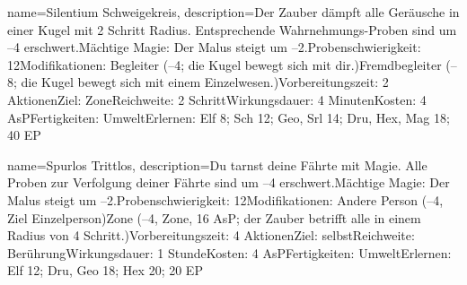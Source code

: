 {
    name={Silentium Schweigekreis},
    description={Der Zauber dämpft alle Geräusche in einer Kugel mit 2 Schritt Radius. Entsprechende Wahrnehmungs-Proben sind um –4 erschwert.\newline Mächtige Magie: Der Malus steigt um –2.\newline Probenschwierigkeit: 12\newline Modifikationen: Begleiter (–4; die Kugel bewegt sich mit dir.)\newline Fremdbegleiter (–8; die Kugel bewegt sich mit einem Einzelwesen.)\newline Vorbereitungszeit: 2 Aktionen\newline Ziel: Zone\newline Reichweite: 2 Schritt\newline Wirkungsdauer: 4 Minuten\newline Kosten: 4 AsP\newline Fertigkeiten: Umwelt\newline Erlernen: Elf 8; Sch 12; Geo, Srl 14; Dru, Hex, Mag 18; 40 EP}
}


{
    name={Spurlos Trittlos},
    description={Du tarnst deine Fährte mit Magie. Alle Proben zur Verfolgung deiner Fährte sind um –4 erschwert.\newline Mächtige Magie: Der Malus steigt um –2.\newline Probenschwierigkeit: 12\newline Modifikationen: Andere Person (–4, Ziel Einzelperson)\newline Zone (–4, Zone, 16 AsP; der Zauber betrifft alle in einem Radius von 4 Schritt.)\newline Vorbereitungszeit: 4 Aktionen\newline Ziel: selbst\newline Reichweite: Berührung\newline Wirkungsdauer: 1 Stunde\newline Kosten: 4 AsP\newline Fertigkeiten: Umwelt\newline Erlernen: Elf 12; Dru, Geo 18; Hex 20; 20 EP}
}


